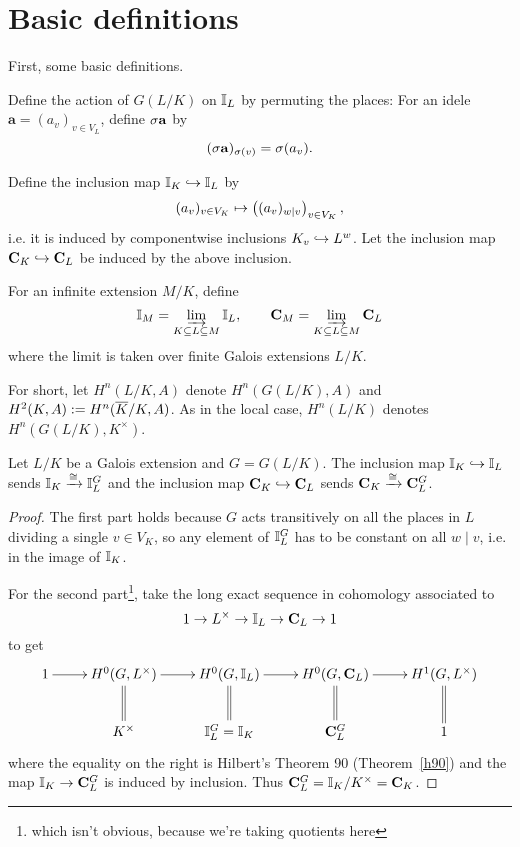 \section{Basic definitions}
First, some basic definitions.
\begin{df}
Define the action of $G(L/K)$ on $\mathbb{I}_L$ by permuting the places: For an idele $\mathbf a=(a_v)_{v\in V_L}$, define $\sigma \mathbf a$ by 
\[(\sigma \mathbf a)_{\sigma(v)}=\sigma(a_v).\]
\end{df}
\begin{df}
Define the inclusion map $\mathbb{I}_K\hookrightarrow \mathbb{I}_L$ by
\[
(a_v)_{v\in V_K}\mapsto \left( {(a_v)_{w\mid v}} \right)_{v\in V_K},
\]
i.e. it is induced by componentwise inclusions $K_v\hookrightarrow L^w$. 
Let the inclusion map $\mathbf C_K\hookrightarrow \mathbf C_L$ be induced by the above inclusion.

For an infinite extension $M/K$, define 
\[
\mathbb{I}_{M}=\varinjlim_{K\subseteq L\subseteq M} \mathbb{I}_L,\qquad \mathbf C_{M}=\varinjlim_{K\subseteq L\subseteq M} \mathbf C_L
\]
where the limit is taken over finite Galois extensions $L/K$.
\end{df}
For short, let $H^n(L/K,A)$ denote $H^n(G(L/K),A)$ and $H^2(K,A):=H^n(\overline{K}/K,A)$. As in the local case, $H^n(L/K)$ denotes $H^n(G(L/K),K^{\times})$.
\begin{pr}
Let $L/K$ be a Galois extension and $G=G(L/K)$. 
The inclusion map $\mathbb{I}_K\hookrightarrow \mathbb{I}_L$ sends $\mathbb{I}_K\xrightarrow{\cong}\mathbb{I}_L^G$ and the inclusion map $\mathbf C_K\hookrightarrow \mathbf C_L$ sends $\mathbf C_K\xrightarrow{\cong} \mathbf C_L^G$.
\end{pr}
\begin{proof}
The first part holds because $G$ acts transitively on all the places in $L$ dividing a single $v\in V_K$, so any element of $\mathbb{I}_L^G$ has to be constant on all $w\mid v$, i.e. in the image of $\mathbb{I}_K$.

For the second part\footnote{which isn't obvious, because we're taking quotients here}, take the long exact sequence in cohomology associated to
\[
1\to L^{\times}\to \mathbb{I}_L\to \mathbf C_L\to 1
\]
to get
\[
\xymatrix{
1\ar[r] & H^0(G,L^{\times})\ar@{=}[d] \ar[r] & H^0(G,\I_L)\ar[r]\ar@{=}[d] & H^0(G,\mathbf C_L) \ar[r] \ar@{=}[d] & H^1(G,L^{\times})\ar@{=}[d]\\
& K^{\times} & \I_L^G=\I_K & \mathbf C_L^G & 1
}
\]
where the equality on the right is Hilbert's Theorem 90 (Theorem~\ref{h90}) and the map $\mathbb{I}_K\to \mathbf C_L^G$ is induced by inclusion. Thus $\mathbf C_L^G=\mathbb{I}_K/K^{\times}=\mathbf C_K$.
\end{proof}
